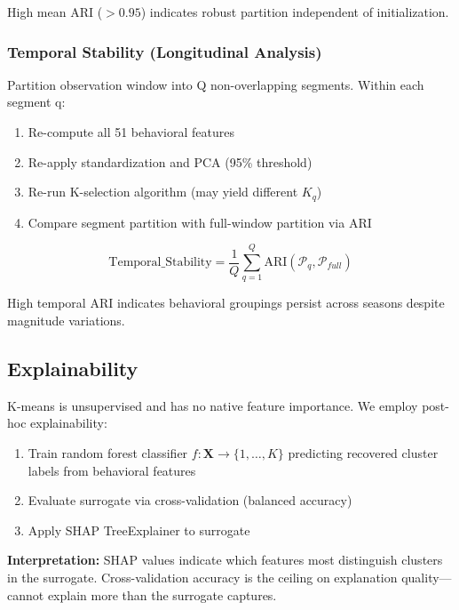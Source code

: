 \documentclass[11pt,a4paper]{article}
\begin{document}
High mean ARI ($> 0.95$) indicates robust partition independent of initialization.

\subsubsection{Temporal Stability (Longitudinal Analysis)}

Partition observation window into Q non-overlapping segments. Within each segment q:
\begin{enumerate}
    \item Re-compute all 51 behavioral features
    \item Re-apply standardization and PCA (95\% threshold)
    \item Re-run K-selection algorithm (may yield different $K_q$)
    \item Compare segment partition with full-window partition via ARI
\end{enumerate}

\begin{equation}
\text{Temporal\_Stability} = \frac{1}{Q} \sum_{q=1}^{Q} \text{ARI}(\mathcal{P}_q, \mathcal{P}_{full})
\end{equation}

High temporal ARI indicates behavioral groupings persist across seasons despite magnitude variations.

\subsection{Explainability}
\label{sec:explainability}

K-means is unsupervised and has no native feature importance. We employ post-hoc explainability:

\begin{enumerate}
    \item Train random forest classifier $f: \mathbf{X} \rightarrow \{1, \ldots, K\}$ predicting recovered cluster labels from behavioral features
    \item Evaluate surrogate via cross-validation (balanced accuracy)
    \item Apply SHAP TreeExplainer \cite{lundberg2017shap} to surrogate
\end{enumerate}

\textbf{Interpretation:} SHAP values indicate which features most distinguish clusters in the surrogate. Cross-validation accuracy is the ceiling on explanation quality---cannot explain more than the surrogate captures.
\end{document}

